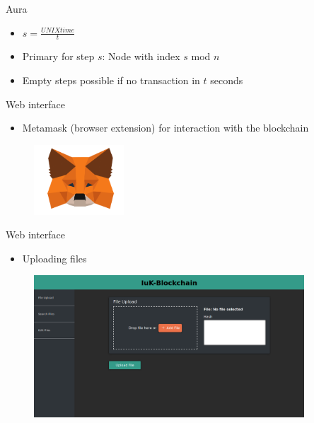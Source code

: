\documentclass[10pt]{beamer}
\begin{document}
\begin{frame}{Aura}
	\begin{itemize}
		\item $s = \frac{UNIXtime}{t}$
		\item Primary for step $s$: Node with index $s$ mod $n$
		\item Empty steps possible if no transaction in $t$ seconds
	\end{itemize}
\end{frame}

\begin{frame}{Web interface}
	\begin{itemize}
		\item Metamask (browser extension) for interaction with the blockchain
	\end{itemize}
	\begin{figure}
		\includegraphics[width=0.3\textwidth]{images/mm-logo.png}
	\end{figure}
\end{frame}

\begin{frame}{Web interface}
	\begin{itemize}
		\item Uploading files
	\end{itemize}
	\begin{figure}
		\includegraphics[width=0.9\textwidth]{images/upload.png}
	\end{figure}
\end{frame}
\end{document}
